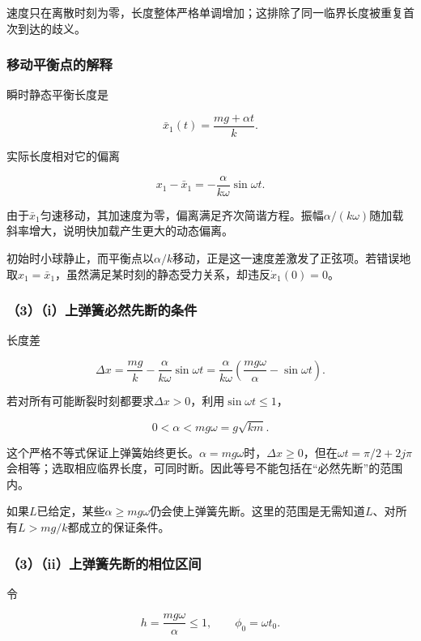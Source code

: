 \documentclass[12pt,a4paper,fontset=fandol]{ctexart}
\begin{document}
速度只在离散时刻为零，长度整体严格单调增加；这排除了同一临界长度被重复首次到达的歧义。

\subsubsection{移动平衡点的解释}\label{ux79fbux52a8ux5e73ux8861ux70b9ux7684ux89e3ux91ca}

瞬时静态平衡长度是

\[
\bar x_1(t)=\frac{mg+\alpha t}{k}.
\]

实际长度相对它的偏离

\[
x_1-\bar x_1=-\frac{\alpha}{k\omega}\sin\omega t.
\]

由于\(\bar x_1\)匀速移动，其加速度为零，偏离满足齐次简谐方程。振幅\(\alpha/(k\omega)\)随加载斜率增大，说明快加载产生更大的动态偏离。

初始时小球静止，而平衡点以\(\alpha/k\)移动，正是这一速度差激发了正弦项。若错误地取\(x_1=\bar x_1\)，虽然满足某时刻的静态受力关系，却违反\(\dot x_1(0)=0\)。

\subsubsection{（3）（i）上弹簧必然先断的条件}\label{iux4e0aux5f39ux7c27ux5fc5ux7136ux5148ux65adux7684ux6761ux4ef6}

长度差

\[
\Delta x=\frac{mg}k-\frac{\alpha}{k\omega}\sin\omega t
=\frac{\alpha}{k\omega}
\left(\frac{mg\omega}{\alpha}-\sin\omega t\right).
\]

若对所有可能断裂时刻都要求\(\Delta x>0\)，利用\(\sin\omega t\leq1\)，

\[
\boxed{0<\alpha<mg\omega=g\sqrt{km}}.
\]

这个严格不等式保证上弹簧始终更长。\(\alpha=mg\omega\)时，\(\Delta x\geq0\)，但在\(\omega t=\pi/2+2j\pi\)会相等；选取相应临界长度，可同时断。因此等号不能包括在``必然先断''的范围内。

如果\(L\)已给定，某些\(\alpha\geq mg\omega\)仍会使上弹簧先断。这里的范围是无需知道\(L\)、对所有\(L>mg/k\)都成立的保证条件。

\subsubsection{（3）（ii）上弹簧先断的相位区间}\label{iiux4e0aux5f39ux7c27ux5148ux65adux7684ux76f8ux4f4dux533aux95f4}

令

\[
h=\frac{mg\omega}{\alpha}\leq1,\qquad
\phi_0=\omega t_0.
\]
\end{document}
